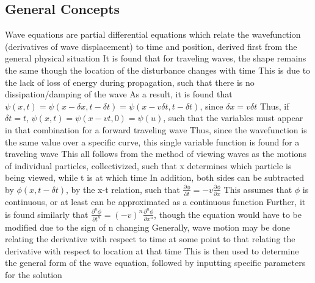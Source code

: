 \documentclass[11 pt, twoside]{article}
\newenvironment{outline*}
{
	\begin{outline}[enumerate]
	}
	{\end{outline}
}
\begin{document}
\subsection{General Concepts}
\begin{outline*}
\1 Wave equations are partial differential equations which relate the wavefunction (derivatives of wave displacement) to time and position, derived first from the general physical situation
\1 It is found that for traveling waves, the shape remains the same though the location of the disturbance changes with time
\2 This is due to the lack of loss of energy during propagation, such that there is no dissipation/damping of the wave
\2 As a result, it is found that $\psi(x, t) = \psi(x - \delta x, t - \delta t) = \psi(x - v\delta t, t - \delta t)$, since $\delta x = v \delta t$
\3 Thus, if $\delta t = t$, $\psi(x, t) = \psi(x - vt, 0) = \psi(u)$, such that the variables must appear in that combination for a forward traveling wave
\3 Thus, since the wavefunction is the same value over a specific curve, this single variable function is found for a traveling wave
\3 This all follows from the method of viewing waves as the motions of individual particles, collectivized, such that x determines which particle is being viewed, while t is at which time
\2 In addition, both sides can be subtracted by $\phi(x, t - \delta t)$, by the x-t relation, such that $\frac{\partial \phi}{\partial t} = -v \frac{\partial \phi}{\partial x}$
\3 This assumes that $\phi$ is continuous, or at least can be approximated as a continuous function
\3 Further, it is found similarly that $\frac{\partial^n \phi}{\partial t^n} = (-v)^n \frac{\partial^n \phi}{\partial x^n}$, though the equation would have to be modified due to the sign of n changing
\1 Generally, wave motion may be done relating the derivative with respect to time at some point to that relating the derivative with respect to location at that time
\2 This is then used to determine the general form of the wave equation, followed by inputting specific parameters for the solution
\end{outline*}
\end{document}
